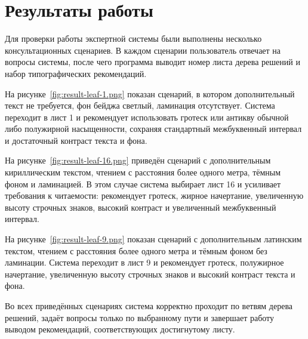 \section{Результаты работы}

Для проверки работы экспертной системы были выполнены несколько консультационных сценариев. В каждом сценарии пользователь отвечает на вопросы системы, после чего программа выводит номер листа дерева решений и набор типографических рекомендаций.

На рисунке~\ref{fig:result-leaf-1.png} показан сценарий, в котором дополнительный текст не требуется, фон бейджа светлый, ламинация отсутствует. Система переходит в лист 1 и рекомендует использовать гротеск или антикву обычной либо полужирной насыщенности, сохраняя стандартный межбуквенный интервал и достаточный контраст текста и фона.


На рисунке~\ref{fig:result-leaf-16.png} приведён сценарий с дополнительным кириллическим текстом, чтением с расстояния более одного метра, тёмным фоном и ламинацией. В этом случае система выбирает лист 16 и усиливает требования к читаемости: рекомендует гротеск, жирное начертание, увеличенную высоту строчных знаков, высокий контраст и увеличенный межбуквенный интервал.


На рисунке~\ref{fig:result-leaf-9.png} показан сценарий с дополнительным латинским текстом, чтением с расстояния более одного метра и тёмным фоном без ламинации. Система переходит в лист 9 и рекомендует гротеск, полужирное начертание, увеличенную высоту строчных знаков и высокий контраст текста и фона.


Во всех приведённых сценариях система корректно проходит по ветвям дерева решений, задаёт вопросы только по выбранному пути и завершает работу выводом рекомендаций, соответствующих достигнутому листу.
